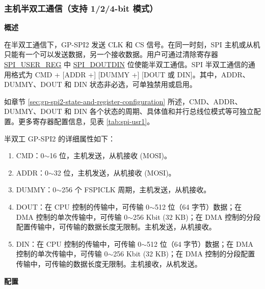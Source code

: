 \documentclass[main\_\_CN.tex]{subfiles}
\begin{document}
\subsubsection{主机半双工通信（支持 1/2/4-bit 模式）}
\label{sec:gp-spi2-1/2/8-bits}

\textbf{概述}

在半双工通信下，GP-SPI2 发送 CLK 和 CS 信号。在同一时刻，SPI 主机或从机只能有一个可以发送数据，另一个接收数据。用户可通过清除寄存器 \hyperref[regdesc:SPIUSERREG]{SPI\_USER\_REG} 中 \hyperref[fielddesc:SPIDOUTDIN]{SPI\_DOUTDIN} 位使能半双工通信。SPI 半双工通信的通用格式为 CMD + [ADDR +] [DUMMY +] [DOUT 或 DIN]。其中，ADDR、DUMMY、DOUT 和 DIN 状态非必选，可单独禁用或启用。

如章节  \ref{sec:gp-spi2-state-and-register-configuration} 所述，CMD、ADDR、DUMMY、DOUT 和 DIN 各个状态的周期、具体值和并行总线位模式等可独立配置。更多寄存器配置信息，见表  \ref{tab:spi-usr1}。

半双工 GP-SPI2 的详细属性如下：

\begin{enumerate}
    \item CMD：0$\sim$16 位，主机发送，从机接收 (MOSI)。
    \item ADDR：0$\sim$32 位，主机发送，从机接收 (MOSI)。
    \item DUMMY：0$\sim$256 个 FSPICLK 周期，主机发送，从机接收。
    \item DOUT：在 CPU 控制的传输中，可传输 0$\sim$512 位（64 字节）数据；在 DMA 控制的单次传输中，可传输 0$\sim$256 Kbit (32 KB)；在 DMA 控制的分段配置传输中，可传输的数据长度无限制。主机发送，从机接收。

    \item DIN：在 CPU 控制的传输中，可传输 0$\sim$512 位（64 字节）数据；在 DMA 控制的单次传输中，可传输 0$\sim$256 Kbit (32 KB)；在 DMA 控制的分段配置传输中，可传输的数据长度无限制。主机接收，从机发送。
\end{enumerate}

\textbf{配置}
\end{document}
